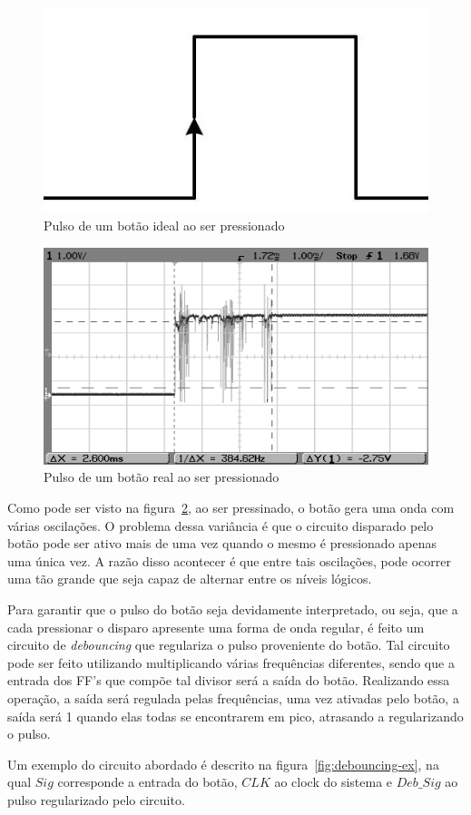 \documentclass[12pt]{article}
\begin{document}
\begin{figure}[!htbp]
\centering
\includegraphics[width=.4\textwidth]{img/btn-ideal.jpg}
\caption{Pulso de um botão ideal ao ser pressionado\cite{btn-ideal}}
\label{fig:btn-ideal}
\end{figure}


\begin{figure}[!htbp]
\centering
\includegraphics[width=.5\textwidth]{img/btn-real.png}
\caption{Pulso de um botão real ao ser pressionado\cite{btn-real}}
\label{fig:btn-real}
\end{figure}

Como pode ser visto na figura~\ref{fig:btn-real}, ao ser pressinado, o botão gera uma onda com várias oscilações. O problema dessa variância é que o circuito disparado pelo botão pode ser ativo mais de uma vez quando o mesmo é pressionado apenas uma única vez. A razão disso acontecer é que entre tais oscilações, pode ocorrer uma tão grande que seja capaz de alternar entre os níveis lógicos\cite{debouncing-reason}.

Para garantir que o pulso do botão seja devidamente interpretado, ou seja, que a cada pressionar o disparo apresente uma forma de onda regular, é feito um circuito de \textit{debouncing} que regulariza o pulso proveniente do botão. Tal circuito pode ser feito utilizando multiplicando várias frequências diferentes, sendo que a entrada dos FF's que compõe tal divisor será a saída do botão. Realizando essa operação, a saída será regulada pelas frequências, uma vez ativadas pelo botão, a saída será 1 quando elas todas se encontrarem em pico, atrasando a regularizando o pulso\cite{debouncing-theory}.

Um exemplo do circuito abordado é descrito na figura~\ref{fig:debouncing-ex}, na qual $Sig$ corresponde a entrada do botão, $CLK$ ao clock do sistema e $Deb\_Sig$ ao pulso regularizado pelo circuito.
\end{document}
